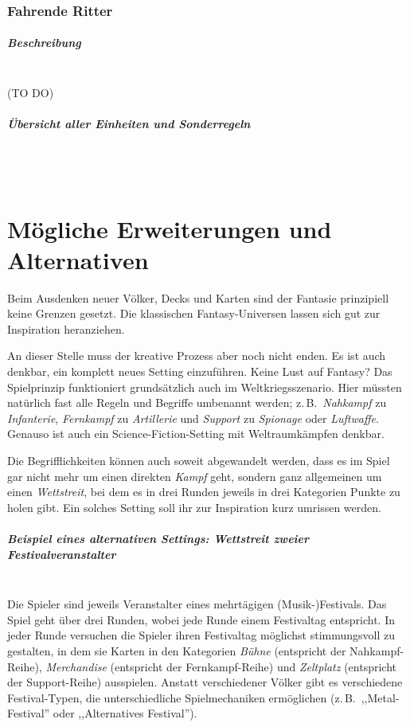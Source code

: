 \documentclass[a4paper,11pt]{report}
\begin{document}
\subsection{Fahrende Ritter}
\paragraph{Beschreibung}~\\
(TO DO)

\paragraph{Übersicht aller Einheiten und Sonderregeln}~\\
\\


\chapter{Mögliche Erweiterungen und Alternativen}
Beim Ausdenken neuer Völker, Decks und Karten sind der Fantasie prinzipiell keine Grenzen gesetzt. Die klassischen Fantasy-Universen lassen sich gut zur Inspiration heranziehen.

An dieser Stelle muss der kreative Prozess aber noch nicht enden. Es ist auch denkbar, ein komplett neues Setting einzuführen. Keine Lust auf Fantasy? Das Spielprinzip funktioniert grundsätzlich auch im Weltkriegsszenario. Hier müssten natürlich fast alle Regeln und Begriffe umbenannt werden; z.\,B.\ \emph{Nahkampf} zu \emph{Infanterie}, \emph{Fernkampf} zu \emph{Artillerie} und \emph{Support} zu \emph{Spionage} oder \emph{Luftwaffe}. Genauso ist auch ein Science-Fiction-Setting mit Weltraumkämpfen denkbar.

Die Begrifflichkeiten können auch soweit abgewandelt werden, dass es im Spiel gar nicht mehr um einen direkten \emph{Kampf} geht, sondern ganz allgemeinen um einen \emph{Wettstreit}, bei dem es in drei Runden jeweils in drei Kategorien Punkte zu holen gibt. Ein solches Setting soll ihr zur Inspiration kurz umrissen werden.

\paragraph{Beispiel eines alternativen Settings: Wettstreit zweier Festivalveranstalter}~\\
Die Spieler sind jeweils Veranstalter eines mehrtägigen (Musik-)Festivals. Das Spiel geht über drei Runden, wobei jede Runde einem Festivaltag entspricht. In jeder Runde versuchen die Spieler ihren Festivaltag möglichst stimmungsvoll zu gestalten, in dem sie Karten in den Kategorien \emph{Bühne} (entspricht der Nahkampf-Reihe), \emph{Merchandise} (entspricht der Fernkampf-Reihe) und \emph{Zeltplatz} (entspricht der Support-Reihe) ausspielen. Anstatt verschiedener Völker gibt es verschiedene Festival-Typen, die unterschiedliche Spielmechaniken ermöglichen (z.\,B.\ ,,Metal-Festival'' oder ,,Alternatives Festival'').
\end{document}
